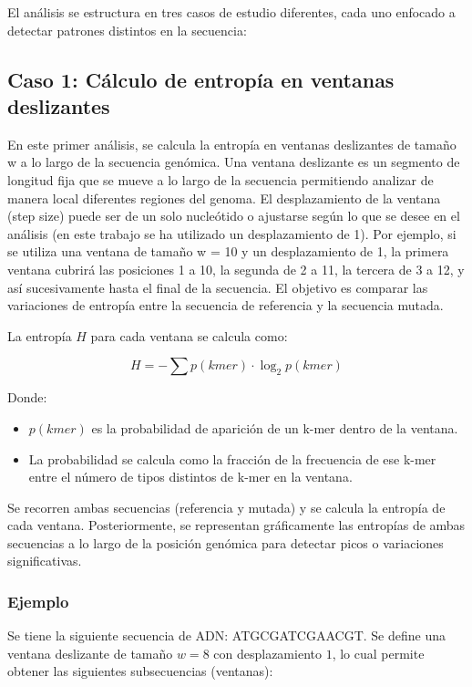 \documentclass[11pt,spanish,listoffigures,listoftables]{tfgetsinf}
\begin{document}
El análisis se estructura en tres casos de estudio diferentes, cada uno enfocado a detectar patrones distintos en la secuencia:

\subsection{Caso 1: Cálculo de entropía en ventanas deslizantes}

En este primer análisis, se calcula la entropía en ventanas deslizantes de tamaño w a lo largo de la secuencia genómica. Una ventana deslizante es un segmento de longitud fija que se mueve a lo largo de la secuencia permitiendo analizar de manera local diferentes regiones del genoma. El desplazamiento de la ventana (step size) puede ser de un solo nucleótido o ajustarse según lo que se desee en el análisis (en este trabajo se ha utilizado un desplazamiento de 1). Por ejemplo, si se utiliza una ventana de tamaño w = 10 y un desplazamiento de 1, la primera ventana cubrirá las posiciones 1 a 10, la segunda de 2 a 11, la tercera de 3 a 12, y así sucesivamente hasta el final de la secuencia. El objetivo es comparar las variaciones de entropía entre la secuencia de referencia y la secuencia mutada.

La entropía $H$ para cada ventana se calcula como:

\[
H = - \sum p(kmer) \cdot \log_2 p(kmer)
\]

Donde:

\begin{itemize}
   \item $p(kmer)$ es la probabilidad de aparición de un k-mer dentro de la ventana.
   \item La probabilidad se calcula como la fracción de la frecuencia de ese k-mer entre el número de tipos distintos de k-mer en la ventana.
\end{itemize}

Se recorren ambas secuencias (referencia y mutada) y se calcula la entropía de cada ventana. Posteriormente, se representan gráficamente las entropías de ambas secuencias a lo largo de la posición genómica para detectar picos o variaciones significativas.

\subsubsection{Ejemplo}

Se tiene la siguiente secuencia de ADN: ATGCGATCGAACGT. Se define una ventana deslizante de tamaño $w = 8$ con desplazamiento $1$, lo cual permite obtener las siguientes subsecuencias (ventanas):
\end{document}
